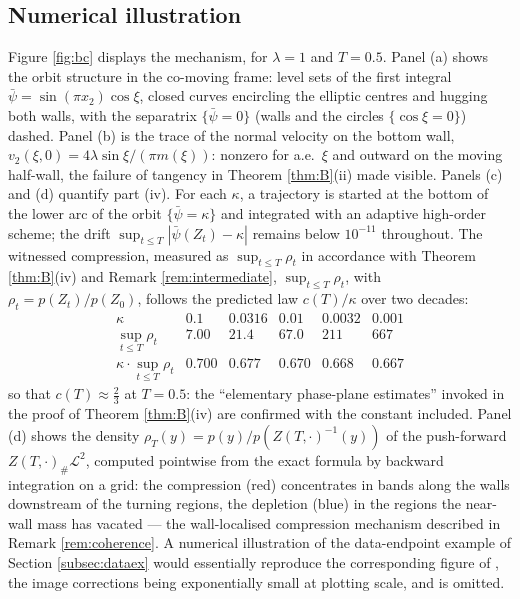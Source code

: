 \documentclass[11pt]{amsart}
\theoremstyle{definition}
\newcommand{\LL}[1]{\mathcal{L}^{#1}}
\begin{document}
\subsection{Numerical illustration}\label{subsec:numerics}

Figure \ref{fig:bc} displays the mechanism, for $\lambda=1$ and
$T=0.5$. Panel (a) shows the orbit structure in the co-moving frame:
level sets of the first integral $\bar\psi=\sin(\pi x_2)\cos\xi$,
closed curves encircling the elliptic centres and hugging both walls,
with the separatrix $\{\bar\psi=0\}$ (walls and the circles
$\{\cos\xi=0\}$) dashed. Panel (b) is the trace of the normal
velocity on the bottom wall, $v_2(\xi,0)=4\lambda\sin\xi/(\pi
m(\xi))$: nonzero for a.e.\ $\xi$ and outward on the moving
half-wall, the failure of tangency in Theorem \ref{thm:B}(ii) made
visible. Panels (c) and (d) quantify part (iv). For each
$\kappa$, a trajectory is started at the bottom of the lower arc of
the orbit $\{\bar\psi=\kappa\}$ and integrated with an adaptive
high-order scheme; the drift $\sup_{t\le T}|\bar\psi(Z_t)-\kappa|$
remains below $10^{-11}$ throughout. The witnessed compression, measured as
$\sup_{t\le T}\rho_t$ in accordance with Theorem
\ref{thm:B}(iv) and Remark \ref{rem:intermediate},
$\sup_{t\le T}\rho_t$, with $\rho_t=p(Z_t)/p(Z_0)$, follows the
predicted law $c(T)/\kappa$ over two decades:
\[
\begin{array}{c|ccccc}
\kappa & 0.1 & 0.0316 & 0.01 & 0.0032 & 0.001\\ \hline
\sup_{t\le T}\rho_t & 7.00 & 21.4 & 67.0 & 211 & 667\\
\kappa\cdot\sup_{t\le T}\rho_t & 0.700 & 0.677 & 0.670 & 0.668 &
0.667
\end{array}
\]
so that $c(T)\approx\tfrac23$ at $T=0.5$: the ``elementary
phase-plane estimates'' invoked in the proof of Theorem
\ref{thm:B}(iv) are confirmed with the constant included. Panel (d)
shows the density $\rho_T(y)=p(y)/p(Z(T,\cdot)^{-1}(y))$ of the
push-forward $Z(T,\cdot)_\#\LL{2}$, computed pointwise from the
exact formula by backward integration on a grid: the compression
(red) concentrates in bands along the walls downstream of the
turning regions, the depletion (blue) in the regions the near-wall
mass has vacated --- the wall-localised compression mechanism
described in Remark \ref{rem:coherence}. A numerical illustration of the data-endpoint
example of Section \ref{subsec:dataex} would essentially reproduce
the corresponding figure of \cite{pfode}, the image corrections
being exponentially small at plotting scale, and is omitted.
\end{document}
